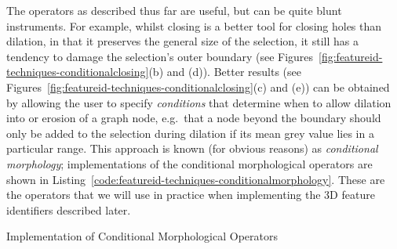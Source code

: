 The operators as described thus far are useful, but can be quite blunt instruments. For example, whilst closing is a better tool for closing holes than dilation, in that it preserves the general size of the selection, it still has a tendency to damage the selection's outer boundary (see Figures~\ref{fig:featureid-techniques-conditionalclosing}(b) and (d)). Better results (see Figures~\ref{fig:featureid-techniques-conditionalclosing}(c) and (e)) can be obtained by allowing the user to specify \emph{conditions} that determine when to allow dilation into or erosion of a graph node, e.g.~that a node beyond the boundary should only be added to the selection during dilation if its mean grey value lies in a particular range. This approach is known (for obvious reasons) as \emph{conditional morphology}; implementations of the conditional morphological operators are shown in Listing~\ref{code:featureid-techniques-conditionalmorphology}. These are the operators that we will use in practice when implementing the 3D feature identifiers described later.

\begin{stulisting}[p]
\caption{Implementation of Conditional Morphological Operators}
\label{code:featureid-techniques-conditionalmorphology}

\end{stulisting}

